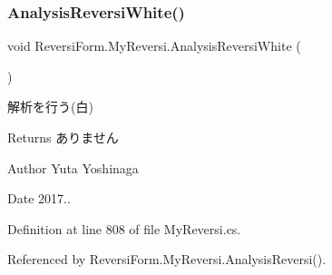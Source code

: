 \subsubsection{\texorpdfstring{Analysis\+Reversi\+White()}{AnalysisReversiWhite()}}
{\footnotesize\ttfamily void Reversi\+Form.\+My\+Reversi.\+Analysis\+Reversi\+White (\begin{DoxyParamCaption}{ }\end{DoxyParamCaption})\hspace{0.3cm}{\ttfamily [private]}}



解析を行う(白) 

\begin{DoxyReturn}{Returns}
ありません 
\end{DoxyReturn}
\begin{DoxyAuthor}{Author}
Yuta Yoshinaga 
\end{DoxyAuthor}
\begin{DoxyDate}{Date}
2017.. 
\end{DoxyDate}


Definition at line 808 of file My\+Reversi.\+cs.



Referenced by Reversi\+Form.\+My\+Reversi.\+Analysis\+Reversi().

